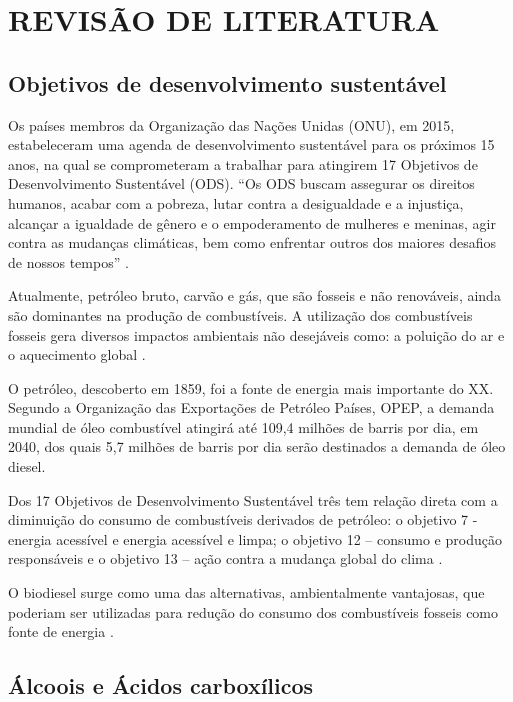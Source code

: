 
\chapter{REVISÃO DE LITERATURA}
\label{chap:revisao_bibliografica}
\section{Objetivos de desenvolvimento sustentável}

Os países membros da Organização das Nações Unidas (ONU), em 2015, estabeleceram uma agenda de desenvolvimento sustentável para os próximos 15 anos, na qual se comprometeram a trabalhar para atingirem 17 Objetivos de Desenvolvimento Sustentável (ODS).
“Os ODS buscam assegurar os direitos humanos, acabar com a pobreza, lutar contra a desigualdade e a injustiça, alcançar a igualdade de gênero e o empoderamento de mulheres e meninas, agir contra as mudanças climáticas, bem como enfrentar outros dos maiores desafios de nossos tempos” \cite{pactoglobal}.

Atualmente, petróleo bruto, carvão e gás, que são fosseis e não renováveis, ainda são dominantes na produção de combustíveis. A utilização dos combustíveis fosseis gera diversos impactos ambientais não desejáveis como: a poluição do ar e o aquecimento global \cite{Gebremariam2018}.

O petróleo, descoberto em 1859, foi a fonte de energia mais importante do  XX. Segundo  a Organização das Exportações de Petróleo Países, OPEP, a demanda mundial de óleo combustível atingirá até 109,4 milhões de barris por dia, em 2040, dos quais 5,7 milhões de barris por dia serão destinados a demanda de óleo diesel.

Dos 17 Objetivos de Desenvolvimento Sustentável três tem relação direta com a diminuição do consumo de combustíveis derivados de petróleo: o objetivo 7 - energia acessível e energia acessível e limpa; o objetivo 12 – consumo e produção responsáveis e o objetivo 13 – ação contra a mudança global do clima \cite{ONU}.

O biodiesel surge como uma das alternativas, ambientalmente vantajosas, que poderiam ser utilizadas para redução do consumo  dos combustíveis fosseis como fonte de energia . 

\section{Álcoois e Ácidos  carboxílicos}


